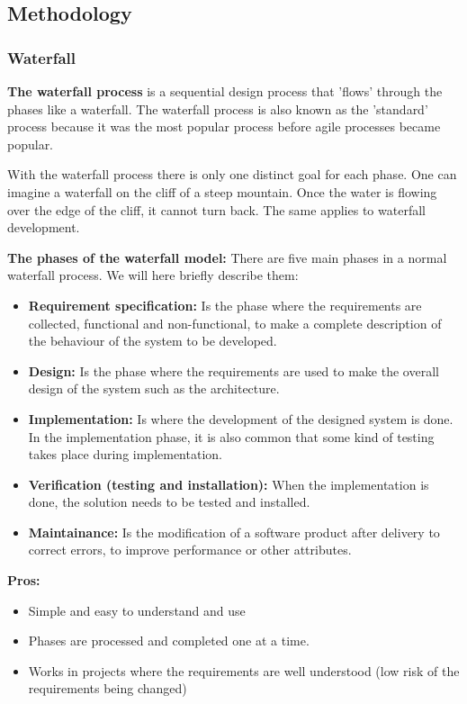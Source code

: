 \subsection{Methodology}

\subsubsection{Waterfall}

{\bf The waterfall process } is a sequential design process that 'flows' through the phases like a waterfall.
The waterfall process is also known as the 'standard' process because it was the most popular process before
agile processes became popular. 

With the waterfall process there is only one distinct goal for each phase. One can imagine a waterfall on the cliff of a steep mountain. Once the water is flowing over the edge of the cliff, it cannot turn back. The same applies to waterfall development. \cite{wikiWaterfall, techtargetWaterfall}

{\bf The phases of the waterfall model:} There are five main phases in a normal waterfall process. We will here briefly
describe them:
\begin{itemize}
	\item {\bf Requirement specification:} Is the phase where the requirements are collected, functional and non-functional, to make a complete description of the behaviour of the system to be developed.
	\item {\bf Design: } Is the phase where the requirements are used to make the overall design of the system such as the
	architecture.
	\item {\bf Implementation:} Is where the development of the designed system is done. In the implementation phase, 
	it is also common that some kind of testing takes place during implementation.
	\item {\bf Verification (testing and installation): } When the implementation is done, the solution needs to be tested and installed.
	\item {\bf Maintainance:} Is the modification of a software product after delivery to correct errors, to improve performance or other attributes.
\end{itemize}

{\bf Pros: }
\begin{itemize}
	\item Simple and easy to understand and use
	\item Phases are processed and completed one at a time.
	\item Works in projects where the requirements are well understood (low risk of the requirements being changed)
\end{itemize}


